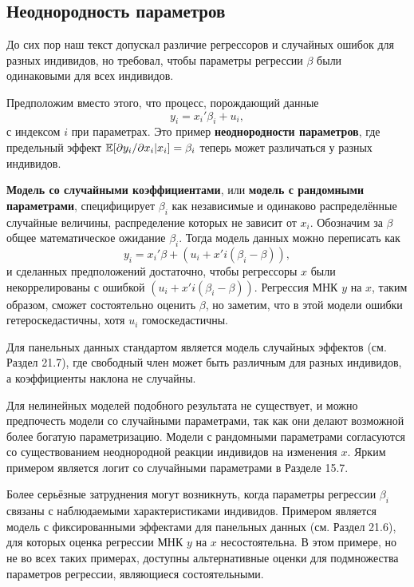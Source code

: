 \subsection{Неоднородность параметров}
До сих пор наш текст допускал различие регрессоров и случайных ошибок для разных индивидов, но требовал, чтобы параметры регрессии $\beta$ были одинаковыми для всех индивидов. 

Предположим вместо этого, что процесс, порождающий данные
\begin{equation}
y_i = x_i'\beta_i + u_i, 
\end{equation}
с индексом $i$ при параметрах. Это пример \textbf{неоднородности параметров}, где предельный эффект $\mathbb{E}[\partial y_i/\partial x_i| x_i]=\beta_i$ теперь может различаться у разных индивидов.

\textbf{Модель со случайными коэффициентами}, или \textbf{модель с рандомными параметрами}, специфицирует $\beta_i$ как независимые и одинаково распределённые случайные величины, распределение которых не зависит от $x_i$. Обозначим за $\beta$ общее математическое ожидание $\beta_i$. Тогда модель данных можно переписать как 
$$
y_i = x_i'\beta + (u_i +x'i(\beta_i -\beta)),
$$
и сделанных предположений достаточно, чтобы регрессоры $x$ были некоррелированы с ошибкой $(u_i +x'i(\beta_i -\beta))$. Регрессия МНК $y$ на $x$, таким образом, сможет состоятельно оценить $\beta$, но заметим, что в этой модели ошибки гетероскедастичны, хотя $u_i$ гомоскедастичны.

Для панельных данных стандартом является модель случайных эффектов (см. Раздел 21.7), где свободный член может быть различным для разных индивидов, а коэффициенты наклона не случайны.

Для нелинейных моделей подобного результата не существует, и можно предпочесть модели со случайными параметрами, так как они делают возможной более богатую параметризацию. Модели с рандомными параметрами согласуются со существованием неоднородной реакции индивидов на изменения $x$. Ярким примером является логит со случайными параметрами в Разделе 15.7.

Более серьёзные затруднения могут возникнуть, когда параметры регрессии $\beta_i$ связаны с наблюдаемыми характеристиками индивидов. Примером является модель с фиксированными эффектами для панельных данных (см. Раздел 21.6), для которых оценка регрессии МНК $y$ на $x$ несостоятельна. В этом примере, но не во всех таких примерах, доступны альтернативные оценки для подмножества параметров регрессии, являющиеся состоятельными.

